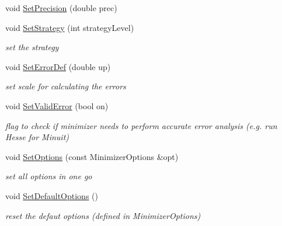 \begin{DoxyCompactItemize}
void \mbox{\hyperlink{classROOT_1_1Math_1_1Minimizer_a96160fe12f3cddf6ca0668ddb4a585bc}{Set\+Precision}} (double prec)
\item 
void \mbox{\hyperlink{classROOT_1_1Math_1_1Minimizer_a86a1145e00a7912ac061bad0e11b6c0b}{Set\+Strategy}} (int strategy\+Level)
\begin{DoxyCompactList}\small\item\em set the strategy \end{DoxyCompactList}\item 
void \mbox{\hyperlink{classROOT_1_1Math_1_1Minimizer_a24e7d646b58b9d5d2778c7c0399677da}{Set\+Error\+Def}} (double up)
\begin{DoxyCompactList}\small\item\em set scale for calculating the errors \end{DoxyCompactList}\item 
void \mbox{\hyperlink{classROOT_1_1Math_1_1Minimizer_a31289e6911a86aba956d0050cee2555b}{Set\+Valid\+Error}} (bool on)
\begin{DoxyCompactList}\small\item\em flag to check if minimizer needs to perform accurate error analysis (e.\+g. run Hesse for Minuit) \end{DoxyCompactList}\item 
void \mbox{\hyperlink{classROOT_1_1Math_1_1Minimizer_ac1546eeefbfb78bcfaf6d06cfde227c5}{Set\+Options}} (const Minimizer\+Options \&opt)
\begin{DoxyCompactList}\small\item\em set all options in one go \end{DoxyCompactList}\item 
void \mbox{\hyperlink{classROOT_1_1Math_1_1Minimizer_a4811690d47537dbc0ab09d50d57ce34f}{Set\+Default\+Options}} ()
\begin{DoxyCompactList}\small\item\em reset the defaut options (defined in Minimizer\+Options) \end{DoxyCompactList}\end{DoxyCompactItemize}
